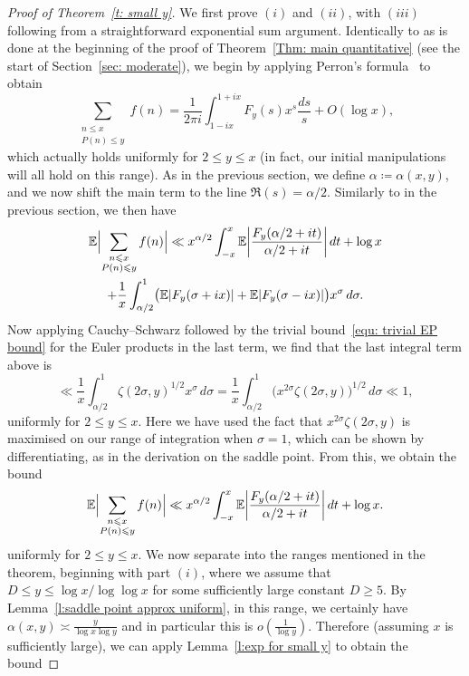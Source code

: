 \documentclass[12pt,a4paper,reqno]{amsart}
\numberwithin{equation}{section}
\def\E{\mathbb E}
\def\leq {\leqslant}
\theoremstyle{remark}
\theoremstyle{definition}
\numberwithin{equation}{section}
\theoremstyle{remark}
\def\E{\mathbb E}
\begin{document}
\begin{proof}[Proof of Theorem~\ref{t: small y}]

We first prove $(i)$ and $(ii)$, with $(iii)$ following from a straightforward exponential sum argument. Identically to as is done at the beginning of the proof of Theorem~\ref{Thm: main quantitative} (see the start of Section~\ref{sec: moderate}), we begin by applying Perron's formula~\cite[Corollary~5.3]{MV2007} to obtain
\[
\sum_{\substack{n \leq x \\ P(n) \leq y}} f(n) = \frac{1}{2 \pi i} \int_{1 - i x}^{1 + ix} F_y (s) x^s \frac{ds}{s} + O (\log x),
\]
which actually holds uniformly for $2 \leq y \leq x$ (in fact, our initial manipulations will all hold on this range). As in the previous section, we define $\alpha \coloneqq \alpha(x,y)$, and we now shift the main term to the line $\Re (s) = \alpha/2$. Similarly to in the previous section, we then have
\begin{multline*}
\E \Bigl| \sum_{\substack{n \leq x \\ P(n) \leq y}} f(n) \Bigr| \ll  x^{\alpha/2} \int_{-x}^{x} \E \biggl| \frac{F_y (\alpha / 2 + it)}{\alpha / 2 + it} \biggr| \, dt + \log x \\ 
+ \frac{1}{x} \int_{\alpha/2}^1 \bigl( \E|F_y (\sigma + ix)| + \E|F_y (\sigma - ix)| \bigr) x^{\sigma} \, d \sigma  .
\end{multline*}
Now applying Cauchy--Schwarz followed by the trivial bound~\eqref{equ: trivial EP bound} for the Euler products in the last term, we find that the last integral term above is 
\[
\ll \frac{1}{x} \int_{\alpha/2}^{1} \zeta(2 \sigma, y)^{1/2} x^{\sigma} \, d \sigma = \frac{1}{x}  \int_{\alpha/2}^{1} \bigl( x^{2\sigma} \zeta (2 \sigma, y) \bigr)^{1/2} \, d \sigma \ll 1,
\]
uniformly for $2 \leq y \leq x$. Here we have used the fact that $x^{2\sigma} \zeta (2\sigma, y)$ is maximised on our range of integration when $\sigma = 1$, which can be shown by differentiating, as in the derivation on the saddle point. From this, we obtain the bound
\begin{equation}\label{equ: before sep y ranges}
\E \Bigl| \sum_{\substack{n \leq x \\ P(n) \leq y}} f(n) \Bigr| \ll  x^{\alpha/2} \int_{-x}^{x} \E \biggl| \frac{F_y (\alpha / 2 + it)}{\alpha / 2 + it} \biggr| \, dt + \log x .
\end{equation}
uniformly for $2 \leq y \leq x$. We now separate into the ranges mentioned in the theorem, beginning with part $(i)$, where we assume that $D \leq y \leq \log x / \log \log x$ for some sufficiently large constant $D \geq 5$. By Lemma~\ref{l:saddle point approx uniform}, in this range, we certainly have $\alpha (x,y) \asymp \frac{y}{\log x \log y}$ and in particular this is $o(\frac{1}{\log y})$. Therefore (assuming $x$ is sufficiently large), we can apply Lemma~\ref{l:exp for small y} to obtain the bound

\end{proof}
\end{document}
